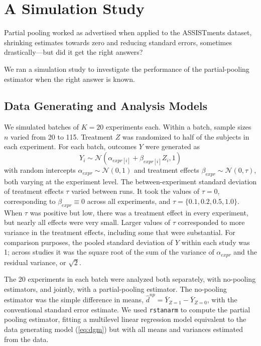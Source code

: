 \documentclass{edm_template}
\newcommand{\tauhat}{\hat{d}^{np}}
\begin{document}
\section{A Simulation Study}\label{sec:simulation}
Partial pooling worked as advertised when applied to the ASSISTments dataset, shrinking estimates towards zero and reducing standard errors, sometimes drastically---but did it get the right answers? 

We ran a simulation study to investigate the performance of the partial-pooling estimator when the right answer is known.

\subsection{Data Generating and Analysis Models}
We simulated batches of $K=20$ experiments each.
Within a batch, sample sizes $n$ varied from 20 to 115.
Treatment $Z$ was randomized to half of the subjects in each experiment.
For each batch, outcomes $Y$ were generated as 
\begin{equation}\label{eq:dgm}
Y_i\sim \mathcal{N}(\alpha_{expr[i]}+\beta_{expr[i]}Z_i,1)
\end{equation}
with random intercepts $\alpha_{expr}\sim\mathcal{N}(0,1)$ and treatment effects $\beta_{expr}\sim\mathcal{N}(0,\tau)$, both varying at the experiment level.
The between-experiment standard deviation of treatment effects $\tau$ varied between runs. 
It took the values of $\tau=0$, corresponding to $\beta_{expr}\equiv 0$ across all experiments, and $\tau=\{0.1,0.2,0.5,1.0\}$.
When $\tau$ was positive but low, there was a treatment effect in every experiment, but nearly all effects were very small.
Larger values of $\tau$ corresponded to more variance in the treatment effects, including some that were substantial. 
For comparison purposes, the pooled standard deviation of $Y$ within each study was 1; across studies it was the square root of the sum of the variance of $\alpha_{expr}$ and the residual variance, or $\sqrt{2}$.

The 20 experiments in each batch were analyzed both separately, with no-pooling estimators, and jointly, with a partial-pooling estimator. 
The no-pooling estimator was the simple difference in means, $\tauhat=\bar{Y}_{Z=1}-\bar{Y}_{Z=0}$, with the conventional standard error estimate.
We used \texttt{rstanarm} to compute the partial pooling estimator, fitting a multilevel linear regression model equivalent to the data generating model (\ref{eq:dgm}) but with all means and variances estimated from the data.
\end{document}
